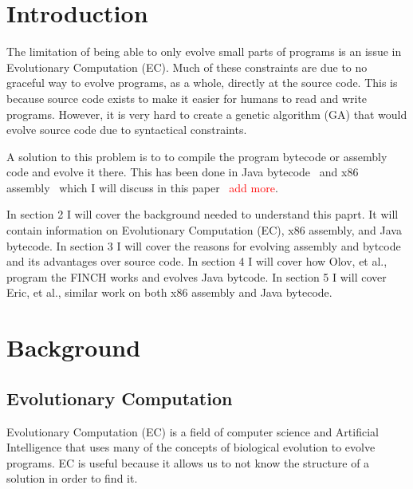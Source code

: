 \documentclass{sig-alternate}
\newcommand{\mycomment}[1]{\textcolor{red}{#1}}
\begin{document}

\section{Introduction}
	The limitation of being able to only evolve small parts of programs is an issue in Evolutionary Computation (EC). Much of these constraints are due to no graceful way to evolve programs, as a whole, directly at the source code. This is because source code exists to make it easier for humans to read and write programs. However, it is very hard to create a genetic algorithm (GA) that would evolve source code due to syntactical constraints.\par
	A solution to this problem is to to compile the program bytecode or assembly code and evolve it there. This has been done in Java bytecode~\cite{FINCH:2011} and x86 assembly~\cite{Assembly:2010} which I will discuss in this paper ~\mycomment{add more}.
	
In section 2 I will cover the background needed to understand this paprt. It will contain information on Evolutionary Computation (EC), x86 assembly, and Java bytecode. In section 3 I will cover the reasons for evolving assembly and bytcode and its advantages over source code. In section 4 I will cover how Olov, et al.,~\cite{FINCH:2011} program the FINCH works and evolves Java bytcode. In section 5 I will cover Eric, et al., similar work on both x86 assembly and Java bytecode.  
	
	

\section{Background}

\subsection{Evolutionary Computation}
Evolutionary Computation (EC) is a field of computer science and Artificial Intelligence that uses many of the concepts of biological evolution to evolve programs. EC is useful because it allows us to not know the structure of a solution in order to find it. \par
\end{document}
